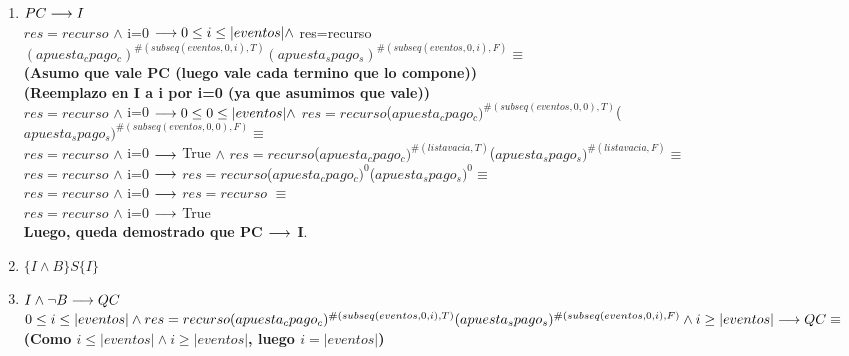 \documentclass[10pt,a4paper]{article}
\begin{document}
\begin{flushleft}
\begin{enumerate} \setlength\itemsep{4mm}
	\item \textbf{$PC \longrightarrow I$} \\
	\vspace{2mm}
	$res= recurso$ $\wedge$ i=0 $\longrightarrow 0\leq i\leq|eventos| \wedge$ res=recurso$(apuesta_cpago_c)^{\#(subseq(eventos,0,i),T)}(apuesta_spago_s)^{\#(subseq(eventos,0,i),F)} \equiv$\\
	\vspace{3mm}
	\textbf{(Asumo que vale PC (luego vale cada termino que lo compone))}\\
	\vspace{3mm}
	\textbf{(Reemplazo en I a i por i=0 (ya que asumimos que vale))}\\
	\vspace{3mm}
	$res= recurso$ $\wedge$ i=0 $\longrightarrow 0\leq 0\leq|eventos| \wedge$ $res=recurso$($apuesta_cpago_c)^{\#(subseq(eventos,0,0),T)}$($apuesta_spago_s)^{\#(subseq(eventos,0,0),F)}\equiv$\\
	\vspace{2mm}
	$res= recurso$ $\wedge$ i=0  $\longrightarrow$  True $ \wedge$ $res=recurso$($apuesta_cpago_c)^{\#(lista vacia,T)}$($apuesta_spago_s)^{\#(lista vacia,F)}\equiv$ \\
	\vspace{2mm}
	$res= recurso$ $\wedge$ i=0  $\longrightarrow$ $res=recurso$($apuesta_cpago_c)^{0}$($apuesta_spago_s)^{0} \equiv $\\
	\vspace{2mm}
	$res= recurso$ $\wedge$ i=0  $\longrightarrow$ $res=recurso$ $\equiv $\\
	\vspace{2mm}
	$res= recurso$ $\wedge$ i=0  $\longrightarrow$ True \\
	\vspace{3mm}
	\textbf{Luego, queda demostrado que PC $\longrightarrow$ I}.\\
	\item \textbf{$\{ I \wedge B \}S\{ I \}$}
	\item \textbf{$I \wedge \neg B \longrightarrow QC$}\\
	\vspace{2mm}
	$0\leq i \leq |eventos| \wedge res=recurso(apuesta_cpago_c)^{\#(subseq(eventos,0,i),T)}(apuesta_spago_s)^{\#(subseq(eventos,0,i),F)} \wedge i \geq |eventos| \longrightarrow QC \equiv $ \\
	\vspace{2mm}
	\textbf{(Como $i \leq |eventos| \wedge i\geq |eventos|$, luego $i=|eventos|$)}\\

\end{enumerate}
\end{flushleft}
\end{document}
